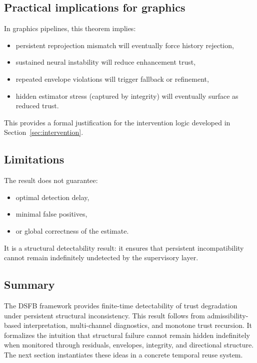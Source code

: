 \documentclass[11pt,letterpaper]{article}
\theoremstyle{gcresult}
\theoremstyle{definition}
\begin{document}

\subsection{Practical implications for graphics}

In graphics pipelines, this theorem implies:

\begin{itemize}[leftmargin=1.5em]
    \item persistent reprojection mismatch will eventually force history rejection,
    \item sustained neural instability will reduce enhancement trust,
    \item repeated envelope violations will trigger fallback or refinement,
    \item hidden estimator stress (captured by integrity) will eventually surface as reduced trust.
\end{itemize}

This provides a formal justification for the intervention logic developed in Section~\ref{sec:intervention}.


\subsection{Limitations}

The result does not guarantee:
\begin{itemize}[leftmargin=1.5em]
    \item optimal detection delay,
    \item minimal false positives,
    \item or global correctness of the estimate.
\end{itemize}

It is a structural detectability result: it ensures that persistent incompatibility cannot remain indefinitely undetected by the supervisory layer.


\subsection{Summary}

The DSFB framework provides finite-time detectability of trust degradation under persistent structural inconsistency. This result follows from admissibility-based interpretation, multi-channel diagnostics, and monotone trust recursion. It formalizes the intuition that structural failure cannot remain hidden indefinitely when monitored through residuals, envelopes, integrity, and directional structure. The next section instantiates these ideas in a concrete temporal reuse system.
\end{document}
